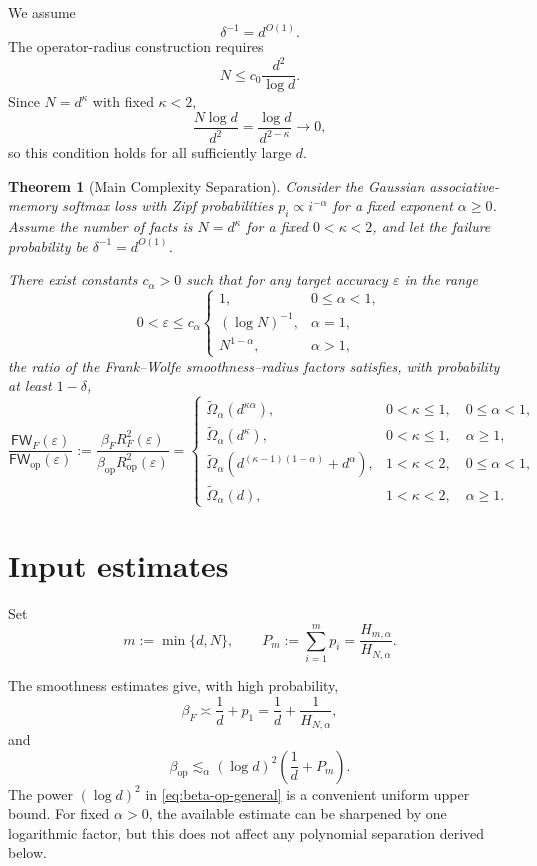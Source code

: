 \documentclass[11pt]{article}
\newtheorem{theorem}{Theorem}
\newcommand{\op}{\mathrm{op}}
\newcommand{\FW}{\mathsf{FW}}
\newcommand{\eps}{\varepsilon}
\begin{document}
We assume
\[
\delta^{-1}=d^{O(1)}.
\]
The operator-radius construction requires
\[
N\le c_0\frac{d^2}{\log d}.
\]
Since $N=d^\kappa$ with fixed $\kappa<2$,
\[
\frac{N\log d}{d^2} = \frac{\log d}{d^{2-\kappa}} \longrightarrow0,
\]
so this condition holds for all sufficiently large $d$.

\begin{theorem}[Main Complexity Separation]
\label{thm:main}
Consider the Gaussian associative-memory softmax loss with Zipf probabilities $p_i \propto i^{-\alpha}$ for a fixed exponent $\alpha \ge 0$. Assume the number of facts is $N=d^\kappa$ for a fixed $0<\kappa<2$, and let the failure probability be $\delta^{-1}=d^{O(1)}$.

There exist constants $c_\alpha > 0$ such that for any target accuracy $\eps$ in the range
\[
0 < \eps \le c_\alpha
\begin{cases}
1, & 0 \le \alpha < 1, \\[1mm]
(\log N)^{-1}, & \alpha = 1, \\[1mm]
N^{1-\alpha}, & \alpha > 1,
\end{cases}
\]
the ratio of the Frank--Wolfe smoothness--radius factors satisfies, with probability at least $1-\delta$,
\[
\boxed{
\frac{\FW_F(\eps)}{\FW_{\op}(\eps)} 
:= \frac{\beta_F R_F^2(\eps)} {\beta_{\op}R_{\op}^2(\eps)} =
\begin{cases}
\widetilde\Omega_\alpha(d^{\kappa\alpha}), & 0<\kappa\le1,\quad 0\le\alpha<1, \\[2mm]
\widetilde\Omega_\alpha(d^\kappa), & 0<\kappa\le1,\quad \alpha\ge1, \\[2mm]
\widetilde\Omega_\alpha\left( d^{(\kappa-1)(1-\alpha)}+d^\alpha \right), & 1<\kappa<2,\quad 0\le\alpha<1, \\[2mm]
\widetilde\Omega_\alpha(d), & 1<\kappa<2,\quad \alpha\ge1.
\end{cases}
}
\]
\end{theorem}

\section{Input estimates}

Set
\[
m:=\min\{d,N\},
\qquad
P_m:=\sum_{i=1}^m p_i =\frac{H_{m,\alpha}}{H_{N,\alpha}}.
\]

The smoothness estimates give, with high probability,
\begin{equation}
\beta_F \asymp \frac1d+p_1 = \frac1d+\frac1{H_{N,\alpha}},
\label{eq:beta-F-general}
\end{equation}
and
\begin{equation}
\beta_{\op} \lesssim_\alpha (\log d)^2 \left( \frac1d+P_m \right).
\label{eq:beta-op-general}
\end{equation}
The power $(\log d)^2$ in \eqref{eq:beta-op-general} is a convenient
uniform upper bound. For fixed $\alpha>0$, the available estimate can
be sharpened by one logarithmic factor, but this does not affect any
polynomial separation derived below.
\end{document}
